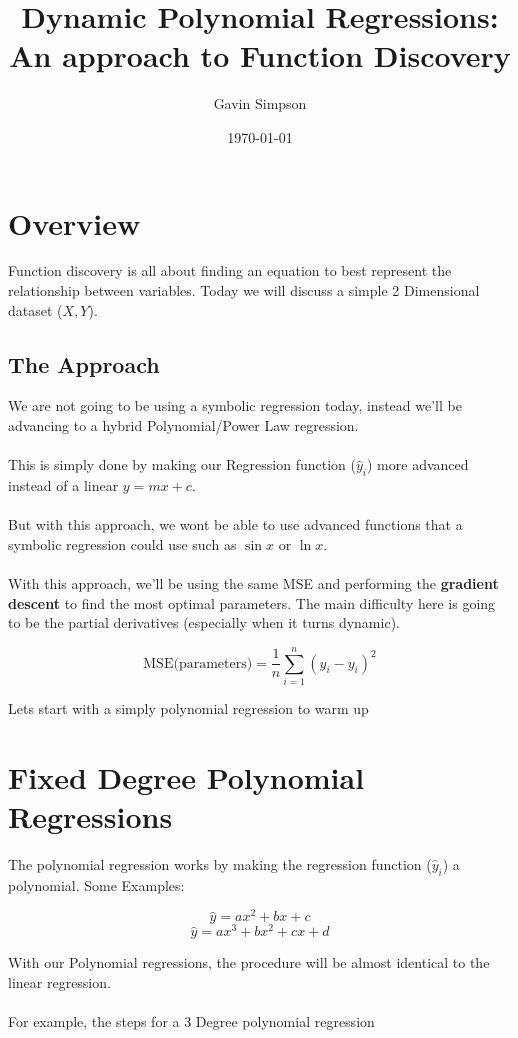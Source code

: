 \documentclass[11pt]{article}
\title{Dynamic Polynomial Regressions: An approach to Function Discovery}
\author{Gavin Simpson}
\date{\today}
\begin{document}
\maketitle

\section{Overview}
Function discovery is all about finding an equation to best represent the relationship between variables. Today we will discuss a simple 2 Dimensional dataset (\(X ,Y\)).

\subsection{The Approach}
We are not going to be using a symbolic regression today, instead we'll be advancing to a hybrid Polynomial/Power Law regression. \\\\This is simply done by making our Regression function (\(\hat{y}_i\)) more advanced instead of a linear \(y=mx+c\). \\\\But with this approach, we wont be able to use advanced functions that a symbolic regression could use such as \(\sin{x}\) or \(\ln{x}\). \\\\With this approach, we'll be using the same MSE and performing the \textbf{gradient descent} to find the most optimal parameters. The main difficulty here is going to be the partial derivatives (especially when it turns dynamic).

\[
\text{MSE(parameters)} = \frac{1}{n} \sum_{i=1}^{n} (\hat{y}_i - y_i)^2
\]

Lets start with a simply polynomial regression to warm up

\section{Fixed Degree Polynomial Regressions}
The polynomial regression works by making the regression function (\(\hat{y}_i\)) a polynomial. Some Examples:

\[\hat{y} = ax^2 + bx + c\]
\[\hat{y} = ax^3 + bx^2 + cx + d\]

With our Polynomial regressions, the procedure will be almost identical to the linear regression. \\\\For example, the steps for a 3 Degree polynomial regression
\end{document}
